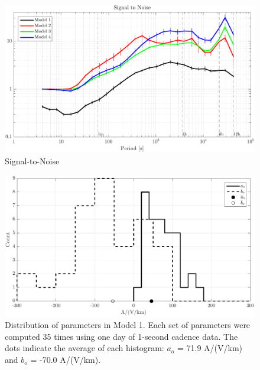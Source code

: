 \documentclass[draft,linenumbers]{agujournal2018}
\begin{document}
\begin{figure}[h]
\centering
\includegraphics[width=\textwidth]{figures/plot_TF_aves_SN-options-1.pdf}
\caption{Signal-to-Noise}
\label{SN}
\end{figure}

\begin{figure}[h]
\centering
\includegraphics[width=\textwidth]{figures/plot_TF_aves_aobo_histograms-options-1.pdf}
\caption{Distribution of parameters in Model 1. Each set of parameters were computed 35 times using one day of 1-second cadence data. The dots indicate the average of each histogram: $a_o$ = 71.9 A/(V/km) and $b_o$ = -70.0 A/(V/km).}
\label{histogram}
\end{figure}
\end{document}
